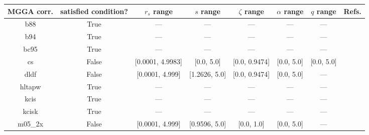 \begin{tabular}{|c|c|c|c|c|c|c|l|}
\hline
   MGGA corr. &  satisfied condition? &      $r_s$ range &        $s$ range & $\zeta$ range & $\alpha$ range & $q$ range  &                                                                              Refs. \\ \hline
          b88 &                  True &              --- &              --- &           --- &            --- &        --- &                                                              \cite{Becke1988_1053} \\ \hline
          b94 &                  True &              --- &              --- &           --- &            --- &        --- &                                                               \cite{Becke1994_625} \\ \hline
         bc95 &                  True &              --- &              --- &           --- &            --- &        --- &                                                              \cite{Becke1996_1040} \\ \hline
           cs &                 False & [0.0001, 4.9983] &       [0.0, 5.0] & [0.0, 0.9474] &     [0.0, 5.0] & [0.0, 5.0] &                                                   \cite{Colle1975_329,Lee1988_785} \\ \hline
         dldf &                 False &  [0.0001, 4.999] &    [1.2626, 5.0] & [0.0, 0.9474] &     [0.0, 5.0] &        --- &                                                           \cite{Pernal2009_263201} \\ \hline
       hltapw &                  True &              --- &              --- &           --- &            --- &        --- &                                                             \cite{Lehtola2021_943} \\ \hline
         kcis &                  True &              --- &              --- &           --- &            --- &        --- & \cite{Rey1998_581,Krieger1999_463,Krieger2001_48,Kurth1999_889,Toulouse2002_10465} \\ \hline
        kcisk &                  True &              --- &              --- &           --- &            --- &        --- & \cite{Rey1998_581,Krieger1999_463,Krieger2001_48,Kurth1999_889,Toulouse2002_10465} \\ \hline
      m05\_2x &                 False &  [0.0001, 4.999] &    [0.9596, 5.0] &    [0.0, 1.0] &     [0.0, 5.0] &        --- &                                                                \cite{Zhao2006_364} \\ \hline

\end{tabular}

